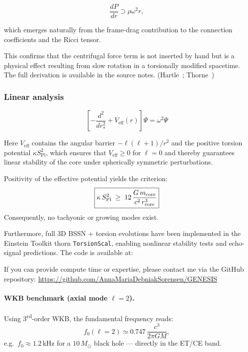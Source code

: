 \documentclass{article}
\newcommand{\Splanck}{\ensuremath{S_{\mathrm{Pl}}}}
\begin{document}
\[
\frac{dP}{dr} \supset \rho \omega^2 r,
\]

which emerges naturally from the frame-drag contribution to the connection coefficients and the Ricci tensor.

This confirms that the centrifugal force term is not inserted by hand but is a physical effect resulting from slow rotation in a torsionally modified spacetime. The full derivation is available in the source notes. (Hartle~\cite{Hartle1967}; Thorne~\cite{Thorne1968})




\subsubsection{Linear analysis}


\begin{equation}
\left[ -\frac{d^{2}}{dr_*^{2}} + V_{\mathrm{eff}}(r) \right] \Psi = \omega^{2} \Psi
\tag{32}
\end{equation}

\noindent
Here $V_{\mathrm{eff}}$ contains the angular barrier $-\ell(\ell+1)/r^{2}$ and the positive torsion potential $\kappa S_{\mathrm{Pl}}^{2}$, which ensures that $V_{\mathrm{eff}} \geq 0$ for $\ell = 0$ and thereby guarantees linear stability of the core under spherically symmetric perturbations.




Positivity of the effective potential yields the criterion:
\begin{equation}
  \boxed{
    \kappa\,\Splanck^2 \;\ge\; 12\,\frac{G\,m_{\rm core}}{c^2\,r_{\rm core}^3}
  }
  \label{eq:linear-criterion}
\end{equation}
Consequently, no tachyonic or growing modes exist.

\vspace{0.5em}
\noindent
Furthermore, full 3D BSSN + torsion evolutions have been implemented in the Einstein Toolkit thorn \texttt{TorsionScal}, enabling nonlinear stability tests and echo-signal predictions. The code is available at:
\begin{center}
 If you can provide compute time or expertise, please contact me via the GitHub repository:  
\url{https://github.com/AnnaMariaDebniakSorensen/GENESIS}

\end{center}

\paragraph{WKB benchmark (axial mode $\ell=2$).}
Using 3\textsuperscript{rd}-order WKB, the fundamental frequency reads:  
\begin{equation}\label{eq:auto24}
f_0(\ell=2)\simeq0.747\,\frac{c^3}{2\pi G M},
\end{equation}
e.g.\ $f_0\approx1.2\,$kHz for a $10\,M_\odot$ black hole — directly in the ET/CE band.
\end{document}
